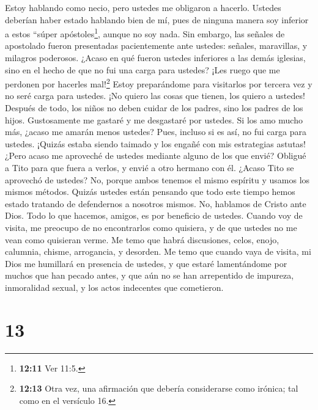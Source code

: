  Estoy hablando como necio, pero ustedes me obligaron a
hacerlo. Ustedes deberían haber estado hablando bien de mí, pues de
ninguna manera soy inferior a estos ``súper apóstoles\footnote{\textbf{12:11}
  Ver 11:5.}, aunque no soy nada.  Sin embargo, las señales
de apostolado fueron presentadas pacientemente ante ustedes: señales,
maravillas, y milagros poderosos.  ¿Acaso en qué fueron
ustedes inferiores a las demás iglesias, sino en el hecho de que no fui
una carga para ustedes? ¡Les ruego que me perdonen por hacerles
mal!\footnote{\textbf{12:13} Otra vez, una afirmación que debería
  considerarse como irónica; tal como en el versículo 16.} 
Estoy preparándome para visitarlos por tercera vez y no seré carga para
ustedes. ¡No quiero las cosas que tienen, los quiero a ustedes! Después
de todo, los niños no deben cuidar de los padres, sino los padres de los
hijos.  Gustosamente me gastaré y me desgastaré por
ustedes. Si los amo mucho más, ¿acaso me amarán menos ustedes?
 Pues, incluso si es así, no fui carga para ustedes.
¡Quizás estaba siendo taimado y los engañé con mis estrategias astutas!
 ¿Pero acaso me aproveché de ustedes mediante alguno de los
que envié?  Obligué a Tito para que fuera a verlos, y envié
a otro hermano con él. ¿Acaso Tito se aprovechó de ustedes? No, porque
ambos tenemos el mismo espíritu y usamos los mismos métodos.
 Quizás ustedes están pensando que todo este tiempo hemos
estado tratando de defendernos a nosotros mismos. No, hablamos de Cristo
ante Dios. Todo lo que hacemos, amigos, es por beneficio de ustedes.
 Cuando voy de visita, me preocupo de no encontrarlos como
quisiera, y de que ustedes no me vean como quisieran verme. Me temo que
habrá discusiones, celos, enojo, calumnia, chisme, arrogancia, y
desorden.  Me temo que cuando vaya de visita, mi Dios me
humillará en presencia de ustedes, y que estaré lamentándome por muchos
que han pecado antes, y que aún no se han arrepentido de impureza,
inmoralidad sexual, y los actos indecentes que cometieron.

\hypertarget{section-12}{%
\section{13}\label{section-12}}

